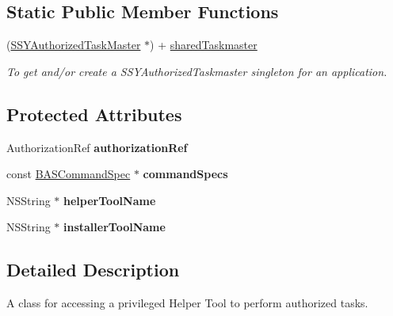 \subsection*{Static Public Member Functions}
\begin{CompactItemize}
\item 
(\hyperlink{class_s_s_y_authorized_task_master}{SSYAuthorizedTaskMaster} $\ast$) + \hyperlink{class_s_s_y_authorized_task_master_b9b315e13355015bbf242cf66a433160}{sharedTaskmaster}
\begin{CompactList}\small\item\em To get and/or create a SSYAuthorizedTaskmaster singleton for an application. \item\end{CompactList}\end{CompactItemize}
\subsection*{Protected Attributes}
\begin{CompactItemize}
\item 
\hypertarget{class_s_s_y_authorized_task_master_8d8405b3d4524350c3496a5c828f8544}{
AuthorizationRef \textbf{authorizationRef}}
\label{class_s_s_y_authorized_task_master_8d8405b3d4524350c3496a5c828f8544}

\item 
\hypertarget{class_s_s_y_authorized_task_master_8f6092c71889dc014f044c26322ed509}{
const \hyperlink{struct_b_a_s_command_spec}{BASCommandSpec} $\ast$ \textbf{commandSpecs}}
\label{class_s_s_y_authorized_task_master_8f6092c71889dc014f044c26322ed509}

\item 
\hypertarget{class_s_s_y_authorized_task_master_cbfe6a3b5e23bff4125ea88cdb5d258d}{
NSString $\ast$ \textbf{helperToolName}}
\label{class_s_s_y_authorized_task_master_cbfe6a3b5e23bff4125ea88cdb5d258d}

\item 
\hypertarget{class_s_s_y_authorized_task_master_957248eb671928690fba798dc45ade00}{
NSString $\ast$ \textbf{installerToolName}}
\label{class_s_s_y_authorized_task_master_957248eb671928690fba798dc45ade00}

\end{CompactItemize}


\subsection{Detailed Description}
A class for accessing a privileged Helper Tool to perform authorized tasks. 

